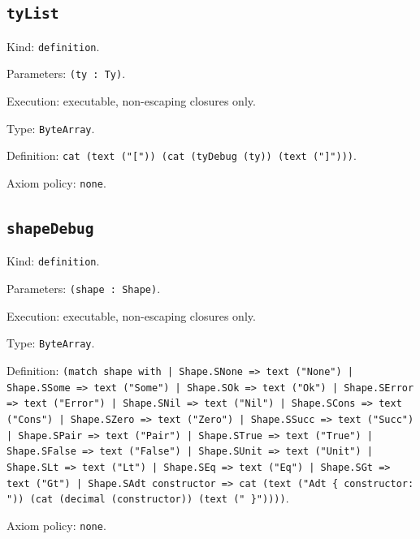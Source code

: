 \documentclass[11pt]{article}
\begin{document}
\subsection*{\texttt{tyList}}
\noindent Kind: \texttt{definition}.\par
\noindent Parameters: \texttt{(ty : Ty)}.\par
\noindent Execution: executable, non-escaping closures only.\par
\noindent Type: \texttt{ByteArray}.\par
\noindent Definition: \texttt{cat (text ("[")) (cat (tyDebug (ty)) (text ("]")))}.\par
\noindent Axiom policy: \texttt{none}.\par
\subsection*{\texttt{shapeDebug}}
\noindent Kind: \texttt{definition}.\par
\noindent Parameters: \texttt{(shape : Shape)}.\par
\noindent Execution: executable, non-escaping closures only.\par
\noindent Type: \texttt{ByteArray}.\par
\noindent Definition: \texttt{(match shape with | Shape.SNone => text ("None") | Shape.SSome => text ("Some") | Shape.SOk => text ("Ok") | Shape.SError => text ("Error") | Shape.SNil => text ("Nil") | Shape.SCons => text ("Cons") | Shape.SZero => text ("Zero") | Shape.SSucc => text ("Succ") | Shape.SPair => text ("Pair") | Shape.STrue => text ("True") | Shape.SFalse => text ("False") | Shape.SUnit => text ("Unit") | Shape.SLt => text ("Lt") | Shape.SEq => text ("Eq") | Shape.SGt => text ("Gt") | Shape.SAdt constructor => cat (text ("Adt \{ constructor: ")) (cat (decimal (constructor)) (text (" \}"))))}.\par
\noindent Axiom policy: \texttt{none}.\par
\end{document}
